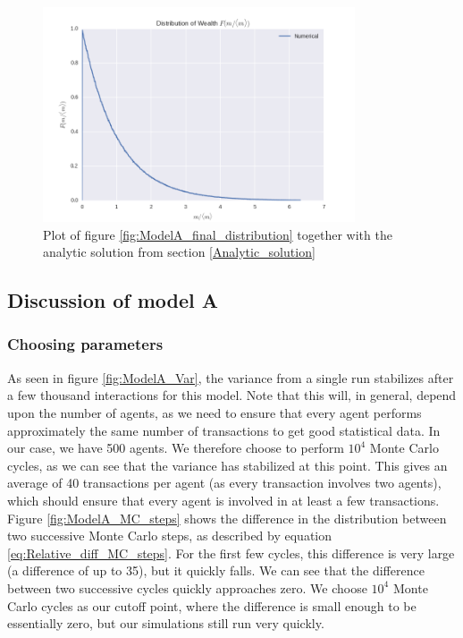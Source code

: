 \documentclass[a4paper, 10pt]{article}
\begin{document}
\begin{figure}[!ht]
\centering
\includegraphics[height=2.5in]{distLamb0.png} %
\caption{Plot of figure \ref{fig:ModelA_final_distribution} together with the analytic solution from section \ref{Analytic_solution}}\label{fig:ModelA_final_distribution_with_analytic}
\end{figure}
\subsection{Discussion of model A}
\subsubsection{Choosing parameters}
As seen in figure \ref{fig:ModelA_Var}, the variance from a single run stabilizes after a few thousand interactions for this model. Note that this will, in general, depend upon the number of agents, as we need to ensure that every agent performs approximately the same number of transactions to get good statistical data. In our case, we have 500 agents. We therefore choose to perform $10^4$ Monte Carlo cycles, as we can see that the variance has stabilized at this point. This gives an average of 40 transactions per agent (as every transaction involves two agents), which should ensure that every agent is involved in at least a few transactions.\\
\linebreak
Figure \ref{fig:ModelA_MC_steps} shows the difference in the distribution between two successive Monte Carlo steps, as described by equation \ref{eq:Relative_diff_MC_steps}. For the first few cycles, this difference is very large (a difference of up to 35), but it quickly falls. We can see that the difference between two successive cycles quickly approaches zero. We choose $10^4$ Monte Carlo cycles as our cutoff point, where the difference is small enough to be essentially zero, but our simulations still run very quickly.
\end{document}
